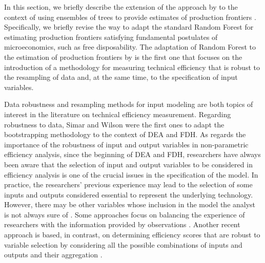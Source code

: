 In this section, we briefly describe the extension of the approach by
\citet{esteve2020} to the context of using ensembles of trees to provide
estimates of production frontiers \citep[see][]{esteve2021}.
Specifically, we briefly revise the way to adapt the standard Random
Forest \citep{breiman2001} for estimating production frontiers
satisfying fundamental postulates of microeconomics, such as free
disposability. The adaptation of Random Forest to the estimation of
production frontiers by \citet{esteve2021} is the first one that focuses
on the introduction of a methodology for measuring technical efficiency
that is robust to the resampling of data and, at the same time, to the
specification of input variables.

Data robustness and resampling methods for input modeling are both
topics of interest in the literature on technical efficiency
measurement. Regarding robustness to data, Simar and Wilson
\citetext{\citeyear{simar1998}; \citeyear{simar2000a}; \citeyear{simar2000b}}
were the first ones to adapt the bootstrapping methodology
\citep{effron1979} to the context of DEA and FDH. As regards the
importance of the robustness of input and output variables in
non-parametric efficiency analysis, since the beginning of DEA and FDH,
researchers have always been aware that the selection of input and
output variables to be considered in efficiency analysis is one of the
crucial issues in the specification of the model. In practice, the
researchers' previous experience may lead to the selection of some
inputs and outputs considered essential to represent the underlying
technology. However, there may be other variables whose inclusion in the
model the analyst is not always sure of \citep{pastor2002}. Some
approaches focus on balancing the experience of researchers with the
information provided by observations \citep[see, for
example,][]{banker1993, banker1996, pastor2002}. Another recent approach
is based, in contrast, on determining efficiency scores that are robust
to variable selection by considering all the possible combinations of
inputs and outputs and their aggregation \citep{landete2017}.

